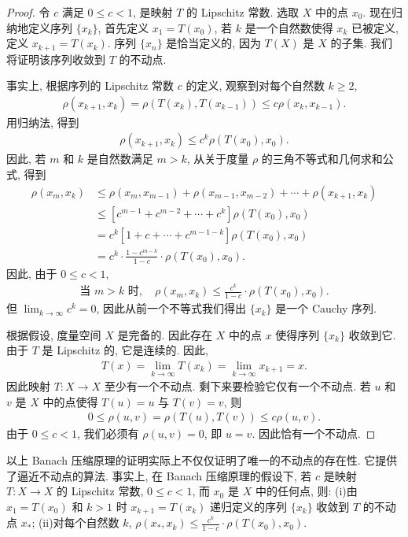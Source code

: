 \documentclass[../../main.tex]{subfiles}
\begin{document}
\begin{proof}
令 $c$ 满足 $0\leqslant c<1$, 是映射 $T$ 的 Lipschitz 常数. 选取 $X$ 中的点 $x_{0}$. 现在归纳地定义序列 $\{x_{k}\}$, 首先定义 $x_{1}=T(x_{0})$, 若 $k$ 是一个自然数使得 $x_{k}$ 已被定义, 定义 $x_{k+1}=T(x_{k})$. 序列 $\{x_{n}\}$ 是恰当定义的, 因为 $T(X)$ 是 $X$ 的子集. 我们将证明该序列收敛到 $T$ 的不动点.

事实上, 根据序列的 Lipschitz 常数 $c$ 的定义, 观察到对每个自然数 $k\geqslant 2$,
\begin{align*}
\rho(x_{k+1},x_{k})=\rho(T(x_{k}),T(x_{k-1}))\leqslant c\rho(x_{k},x_{k-1}).
\end{align*}
用归纳法, 得到
\begin{align*}
\rho(x_{k+1},x_{k})\leqslant c^{k}\rho(T(x_{0}),x_{0}).
\end{align*}
因此, 若 $m$ 和 $k$ 是自然数满足 $m>k$, 从关于度量 $\rho$ 的三角不等式和几何求和公式, 得到
\begin{align*}
\rho(x_{m},x_{k})&\leqslant\rho(x_{m},x_{m-1})+\rho(x_{m-1},x_{m-2})+\cdots+\rho(x_{k+1},x_{k})\\
&\leqslant[c^{m-1}+c^{m-2}+\cdots+c^{k}]\rho(T(x_{0}),x_{0})\\
&=c^{k}[1+c+\cdots+c^{m-1-k}]\rho(T(x_{0}),x_{0})\\
&=c^{k}\cdot\frac{1-c^{m-k}}{1-c}\cdot\rho(T(x_{0}),x_{0}).
\end{align*}
因此, 由于 $0\leqslant c<1$,
\begin{align*}
\text{当 }m>k\text{ 时},\quad\rho(x_{m},x_{k})\leqslant\frac{c^{k}}{1-c}\cdot\rho(T(x_{0}),x_{0}).
\end{align*}
但 $\lim_{k\to\infty}c^{k}=0$, 因此从前一个不等式我们得出 $\{x_{k}\}$ 是一个 Cauchy 序列.

根据假设, 度量空间 $X$ 是完备的. 因此存在 $X$ 中的点 $x$ 使得序列 $\{x_{k}\}$ 收敛到它. 由于 $T$ 是 Lipschitz 的, 它是连续的. 因此,
\begin{align*}
T(x)=\lim_{k\to\infty}T(x_{k})=\lim_{k\to\infty}x_{k+1}=x.
\end{align*}
因此映射 $T:X\to X$ 至少有一个不动点. 剩下来要检验它仅有一个不动点. 若 $u$ 和 $v$ 是 $X$ 中的点使得 $T(u)=u$ 与 $T(v)=v$, 则
\begin{align*}
0\leqslant\rho(u,v)=\rho(T(u),T(v))\leqslant c\rho(u,v).
\end{align*}
由于 $0\leqslant c<1$, 我们必须有 $\rho(u,v)=0$, 即 $u=v$. 因此恰有一个不动点.
\end{proof}

以上 Banach 压缩原理的证明实际上不仅仅证明了唯一的不动点的存在性. 它提供了逼近不动点的算法. 事实上, 在 Banach 压缩原理的假设下, 若 $c$ 是映射 $T:X\to X$ 的 Lipschitz 常数, $0\leqslant c<1$, 而 $x_{0}$ 是 $X$ 中的任何点, 则: (i)由 $x_{1}=T(x_{0})$ 和 $k>1$ 时 $x_{k+1}=T(x_{k})$ 递归定义的序列 $\{x_{k}\}$ 收敛到 $T$ 的不动点 $x_{\ast}$; (ii)对每个自然数 $k$, $\rho(x_{\ast},x_{k})\leqslant\frac{c^{k}}{1-c}\cdot\rho(T(x_{0}),x_{0})$.
\end{document}
